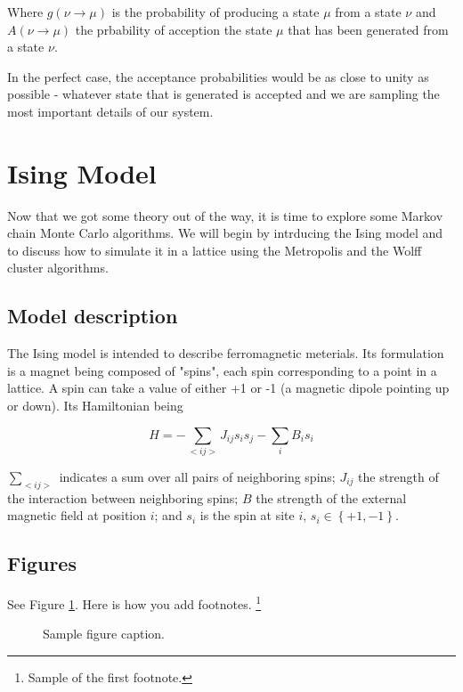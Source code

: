 \documentclass{article}
\begin{document}
Where $g(\nu\rightarrow\mu)$ is the probability of producing a state $\mu$ from a state $\nu$ and $A(\nu\rightarrow\mu)$ the prbability of acception the state $\mu$ that has been generated from a state $\nu$.

In the perfect case, the acceptance probabilities would be as close to unity as possible - whatever state that is generated is accepted and we are sampling the most important details of our system.


\section{Ising Model}

Now that we got some theory out of the way, it is time to explore some Markov chain Monte Carlo algorithms.
We will begin by intrducing the Ising model and to discuss how to simulate it in a lattice using the Metropolis and the Wolff cluster algorithms.

\subsection{Model description}
The Ising model is intended to describe ferromagnetic meterials.
Its formulation is a magnet being composed of "spins", each spin corresponding to a point in a lattice.
A spin can take a value of either +1 or -1 (a magnetic dipole pointing up or down).
Its Hamiltonian being

\begin{equation}
H 
= - \sum_{<ij>} J_{ij} s_i s_j 
  - \sum_i B_i s_i
\end{equation}

$\sum_{<ij>}$ indicates a sum over all pairs of neighboring spins; $J_{ij}$ the strength of the interaction between neighboring spins; $B$ the strength of the external magnetic field at position $i$; and $s_i$ is the spin at site $i$, $s_i \in \left\lbrace +1, -1 \right\rbrace$.


\subsection{Figures}
See Figure \ref{fig:fig1}. Here is how you add footnotes. \footnote{Sample of the first footnote.}

\begin{figure}
  \centering
  \fbox{\rule[-.5cm]{4cm}{4cm} \rule[-.5cm]{4cm}{0cm}}
  \caption{Sample figure caption.}
  \label{fig:fig1}
\end{figure}
\end{document}
